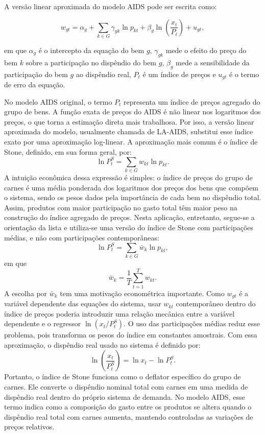 \documentclass[12pt,a4paper]{article}
\begin{document}
A versão linear aproximada do modelo AIDS pode ser escrita como:

\[
w_{gt}
=
\alpha_g
+
\sum_{k \in G}
\gamma_{gk}\ln p_{kt}
+
\beta_g
\ln
\left(
\frac{x_t}{P_t}
\right)
+
u_{gt},
\tag{3}
\label{eq:aids_basico}
\]

em que \(\alpha_g\) é o intercepto da equação do bem \(g\), \(\gamma_{gk}\) mede o efeito do preço do bem \(k\) sobre a participação no dispêndio do bem \(g\), \(\beta_g\) mede a sensibilidade da participação do bem \(g\) ao dispêndio real, \(P_t\) é um índice de preços e \(u_{gt}\) é o termo de erro da equação.

No modelo AIDS original, o termo \(P_t\) representa um índice de preços agregado do grupo de bens. A função exata de preços do AIDS é não linear nos logaritmos dos preços, o que torna a estimação direta mais trabalhosa. Por isso, a versão linear aproximada do modelo, usualmente chamada de LA-AIDS, substitui esse índice exato por uma aproximação log-linear. A aproximação mais comum é o índice de Stone, definido, em sua forma geral, por: \[ \ln P_t^S = \sum_{k \in G} w_{kt}\ln p_{kt}. \tag{4} \label{eq:stone_geral} \] A intuição econômica dessa expressão é simples: o índice de preços do grupo de carnes é uma média ponderada dos logaritmos dos preços dos bens que compõem o sistema, sendo os pesos dados pela importância de cada bem no dispêndio total. Assim, produtos com maior participação no gasto total têm maior peso na construção do índice agregado de preços. Nesta aplicação, entretanto, segue-se a orientação da lista e utiliza-se uma versão do índice de Stone com participações médias, e não com participações contemporâneas: \[ \ln P_t^S = \sum_{k \in G} \bar{w}_k \ln p_{kt}, \tag{5} \label{eq:stone_media} \] em que \[ \bar{w}_k = \frac{1}{T} \sum_{t=1}^{T} w_{kt}. \tag{6} \label{eq:wbar_intro} \] A escolha por \(\bar{w}_k\) tem uma motivação econométrica importante. Como \(w_{gt}\) é a variável dependente das equações do sistema, usar \(w_{kt}\) contemporâneo dentro do índice de preços poderia introduzir uma relação mecânica entre a variável dependente e o regressor \(\ln(x_t/P_t^S)\). O uso das participações médias reduz esse problema, pois transforma os pesos do índice em constantes amostrais. Com essa aproximação, o dispêndio real usado no sistema é definido por: \[ \ln \left( \frac{x_t}{P_t^S} \right) = \ln x_t - \ln P_t^S. \tag{7} \label{eq:ln_real_exp} \] Portanto, o índice de Stone funciona como o deflator específico do grupo de carnes. Ele converte o dispêndio nominal total com carnes em uma medida de dispêndio real dentro do próprio sistema de demanda. No modelo AIDS, esse termo indica como a composição do gasto entre os produtos se altera quando o dispêndio real total com carnes aumenta, mantendo controladas as variações de preços relativos.
\end{document}
